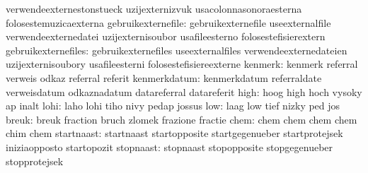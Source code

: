                                   verwendeexternestonstueck        uzijexternizvuk
                                  usacolonnasonoraesterna          folosestemuzicaexterna
              gebruikexternefile: gebruikexternefile               useexternalfile
                                  verwendeexternedatei             uzijexternisoubor
                                  usafileesterno                   folosestefisierextern
             gebruikexternefiles: gebruikexternefiles              useexternalfiles
                                  verwendeexternedateien           uzijexternisoubory
                                  usafileesterni                   folosestefisiereexterne
                         kenmerk: kenmerk                          referral
                                  verweis                          odkaz
                                  referral                         referit %
                    kenmerkdatum: kenmerkdatum                     referraldate
                                  verweisdatum                     odkaznadatum
                                  datareferral                     datareferit
                            high: hoog                             high
                                  hoch                             vysoky
                                  ap                               inalt
                            lohi: laho                             lohi
                                  tiho                             nivy
                                  pedap                            jossus
                             low: laag                             low
                                  tief                             nizky
                                  ped                              jos
                           breuk: breuk                            fraction
                                  bruch                            zlomek
                                  frazione                         fractie
                            chem: chem                             chem
                                  chem                             chem
                                  chim                             chem
                      startnaast: startnaast                       startopposite
                                  startgegenueber                  startprotejsek
                                  iniziaopposto                    startopozit
                       stopnaast: stopnaast                        stopopposite
                                  stopgegenueber                   stopprotejsek
